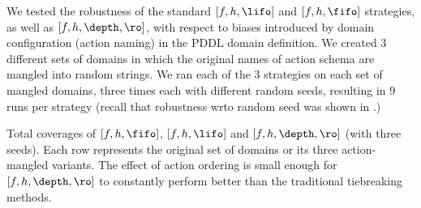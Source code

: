 
We tested the robustness of the standard $[f,h,\lifo]$ and $[f,h,\fifo]$ strategies, as well as $[f,h,\depth,\ro]$,
with respect to 
biases introduced by domain configuration (action naming) in the PDDL domain definition.
We created 3 different sets of domains in which the
original names of action schema are mangled into random strings. 
We ran each of the 3 strategies on each
set of mangled domains, three times each with different random seeds,
resulting in 9 runs per strategy (recall that robustness wrto random seed was shown in .)

\begin{table}[tb]
 \centering {}
 
 \caption{Total coverages of $[f,h,\fifo]$, $[f,h,\lifo]$
 and $[f,h,\depth,\ro]$ (with three seeds). Each row represents the original set of
 domains or its three action-mangled variants. The effect
 of action ordering is small enough for $[f,h,\depth,\ro]$ to
 constantly perform better than the traditional tiebreaking methods.}
 \label{actionordering-robustness}
\end{table}

